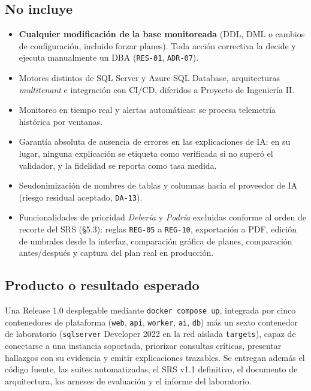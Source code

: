\documentclass[12pt,a4paper]{article}
\begin{document}
\subsection{No incluye}

\begin{itemize}[leftmargin=1.5em]
    \item \textbf{Cualquier modificación de la base monitoreada} (DDL, DML o cambios de configuración, incluido forzar planes). Toda acción correctiva la decide y ejecuta manualmente un DBA (\texttt{RES-01}, \texttt{ADR-07}).
    \item Motores distintos de SQL Server y Azure SQL Database, arquitecturas \textit{multitenant} e integración con CI/CD, diferidos a Proyecto de Ingeniería II.
    \item Monitoreo en tiempo real y alertas automáticas: se procesa telemetría histórica por ventanas.
    \item Garantía absoluta de ausencia de errores en las explicaciones de IA: en su lugar, ninguna explicación se etiqueta como verificada si no superó el validador, y la fidelidad se reporta como tasa medida.
    \item Seudonimización de nombres de tablas y columnas hacia el proveedor de IA (riesgo residual aceptado, \texttt{DA-13}).
    \item Funcionalidades de prioridad \textit{Debería} y \textit{Podría} excluidas conforme al orden de recorte del SRS (§5.3): reglas \texttt{REG-05} a \texttt{REG-10}, exportación a PDF, edición de umbrales desde la interfaz, comparación gráfica de planes, comparación antes/después y captura del plan real en producción.
\end{itemize}

\subsection{Producto o resultado esperado}

Una Release 1.0 desplegable mediante \texttt{docker compose up}, integrada por cinco contenedores de plataforma (\texttt{web}, \texttt{api}, \texttt{worker}, \texttt{ai}, \texttt{db}) más un sexto contenedor de laboratorio (\texttt{sqlserver} Developer 2022 en la red aislada \texttt{targets}), capaz de conectarse a una instancia soportada, priorizar consultas críticas, presentar hallazgos con su evidencia y emitir explicaciones trazables. Se entregan además el código fuente, las suites automatizadas, el SRS v1.1 definitivo, el documento de arquitectura, los arneses de evaluación y el informe del laboratorio.
\end{document}
